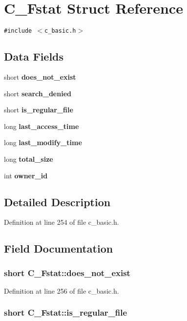 \section{C\_\-Fstat Struct Reference}
\label{structC__Fstat}
{\tt \#include $<$c\_\-basic.h$>$}

\subsection*{Data Fields}
\begin{CompactItemize}
\item 
short \bf{does\_\-not\_\-exist}
\item 
short \bf{search\_\-denied}
\item 
short \bf{is\_\-regular\_\-file}
\item 
long \bf{last\_\-access\_\-time}
\item 
long \bf{last\_\-modify\_\-time}
\item 
long \bf{total\_\-size}
\item 
int \bf{owner\_\-id}
\end{CompactItemize}


\subsection{Detailed Description}




Definition at line 254 of file c\_\-basic.h.

\subsection{Field Documentation}
\subsubsection{\setlength{\rightskip}{0pt plus 5cm}short \bf{C\_\-Fstat::does\_\-not\_\-exist}}\label{structC__Fstat_9f9927adcb3052d77af6d7fa18f64cd0}




Definition at line 256 of file c\_\-basic.h.
\subsubsection{\setlength{\rightskip}{0pt plus 5cm}short \bf{C\_\-Fstat::is\_\-regular\_\-file}}\label{structC__Fstat_9552895082cb21b1137dcdcc260a70e7}




